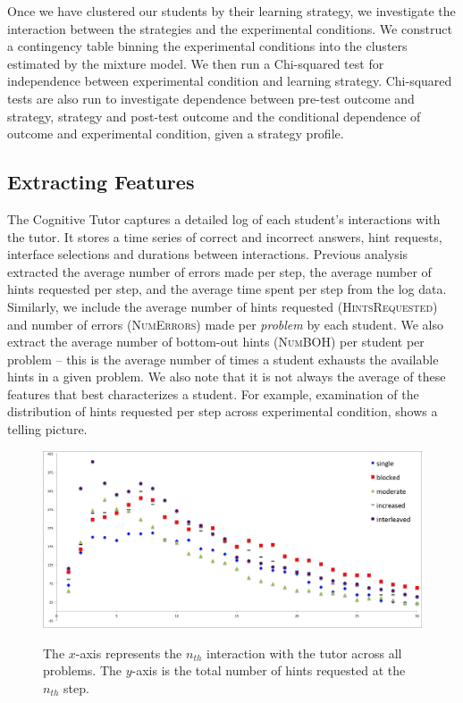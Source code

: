 \documentclass{edm_template}
\newcommand{\ftr}[1]{\textsc{#1}}
\begin{document}
Once we have clustered our students by their learning strategy, we investigate the interaction between the strategies and the experimental conditions. We construct a contingency table binning the experimental conditions into the clusters estimated by the mixture model. We then run a Chi-squared test for independence between experimental condition and learning strategy. Chi-squared tests are also run to investigate dependence between pre-test outcome and strategy, strategy and post-test outcome and the conditional dependence of outcome and experimental condition, given a strategy profile.

\subsection{Extracting Features}
The Cognitive Tutor captures a detailed log of each student's interactions with the tutor. It stores a time series of correct and incorrect answers, hint requests, interface selections and durations between interactions. Previous analysis \cite{Rau2012} extracted the average number of errors made per step, the average number of hints requested per step, and the average time spent per step from the log data. Similarly, we include the average number of hints requested (\ftr{HintsRequested}) and number of errors (\ftr{NumErrors}) made per \emph{problem} by each student. We also extract the average number of bottom-out hints (\ftr{NumBOH}) per student per problem -- this is the average number of times a student exhausts the available hints in a given problem. We also note that it is not always the average of these features that best characterizes a student. For example, examination of the distribution of hints requested per step across experimental condition, shows a telling picture.
\begin{figure}[t!]
\centering
\includegraphics[scale=.48]{hintsByStep2.png}\\
\caption{The $x$-axis represents the $n_{th}$ interaction with the tutor across all problems. The $y$-axis is the total number of hints requested at the $n_{th}$ step.  }
\label{fig:condition-graph}
\end{figure}
\end{document}
